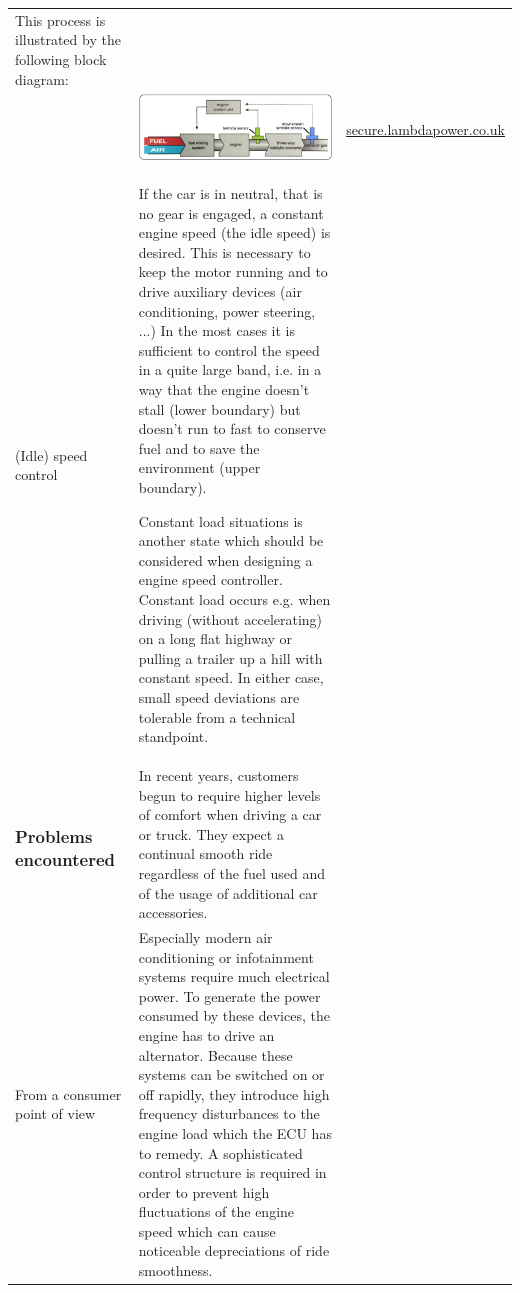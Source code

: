 \documentclass[12pt,a4paper,numbers=noenddot]{scrartcl}
\begin{document}
\begin{xtabular}{|p{3.8cm}|p{8.3cm}|p{4.2cm}|}
	This process is illustrated by the following block diagram:
	&
	
	\\

	&
	{
		\center
		\includegraphics[width=8cm]{material/marvin/LambdaFunctionalDiagram.jpg}
	}
	&
	\url{secure.lambdapower.co.uk}
	\\
	(Idle) speed control
	&
	If the car is in neutral, that is no gear is engaged, a constant engine speed (the idle speed) is desired. This is necessary to keep the motor running and to drive auxiliary devices (air conditioning, power steering, ...) In the most cases it is sufficient to control the speed in a quite large band, i.e. in a way that the engine doesn't stall (lower boundary) but doesn't run to fast to conserve fuel and to save the environment (upper boundary).
	
	Constant load situations is another state which should be considered when designing a engine speed controller. Constant load occurs e.g. when driving (without accelerating) on a long flat highway or pulling a trailer up a hill with constant speed. In either case, small speed deviations are tolerable from a technical standpoint.
	&
	\\
	\vspace*{-1.25\baselineskip}
	\subsubsection{Problems encountered}
	&
	In recent years, customers begun to require higher levels of comfort when driving a car or truck. They expect a continual smooth ride regardless of the fuel used and of the usage of additional car accessories.
	&
	
	\\
	From a consumer point of view
	&
	Especially modern air conditioning or infotainment systems require much electrical power. To generate the power consumed by these devices, the engine has to drive an alternator. Because these systems can be switched on or off rapidly, they introduce high frequency disturbances to the engine load which the ECU has to remedy. A sophisticated control structure is required in order to prevent high fluctuations of the engine speed which can cause noticeable depreciations of ride smoothness.
	

\end{xtabular}
\end{document}
